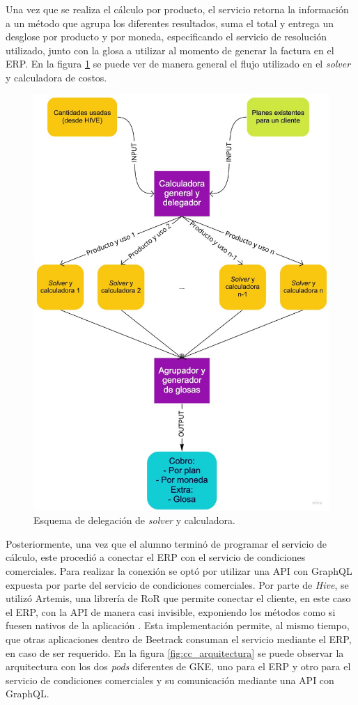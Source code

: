     Una vez que se realiza el cálculo por producto, el servicio retorna la información a un método que agrupa los diferentes resultados, suma el total y entrega un desglose por producto y por moneda, especificando el servicio de resolución utilizado, junto con la glosa a utilizar al momento de generar la factura en el ERP. En la figura \ref{fig:cc_calculator} se puede ver de manera general el flujo utilizado en el \textit{solver} y calculadora de costos.

    \begin{figure}
      \centering
      \includegraphics[width=0.5\linewidth]{figures/cc/cc_calculator.jpg}
      \caption{Esquema de delegación de \textit{solver} y calculadora.}
      \label{fig:cc_calculator}
    \end{figure}


    Posteriormente, una vez que el alumno terminó de programar el servicio de cálculo, este procedió a conectar el ERP con el servicio de condiciones comerciales. Para realizar la conexión se optó por utilizar una API con GraphQL expuesta por parte del servicio de condiciones comerciales. Por parte de \textit{Hive}, se utilizó Artemis, una librería de RoR que permite conectar el cliente, en este caso el ERP, con la API de manera casi invisible, exponiendo los métodos como si fuesen nativos de la aplicación \cite{artemis_gem}. Esta implementación permite, al mismo tiempo, que otras aplicaciones dentro de Beetrack consuman el servicio mediante el ERP, en caso de ser requerido. En la figura \ref{fig:cc_arquitectura} se puede observar la arquitectura con los dos \textit{pods} diferentes de GKE, uno para el ERP y otro para el servicio de condiciones comerciales y su comunicación mediante una API con GraphQL.

